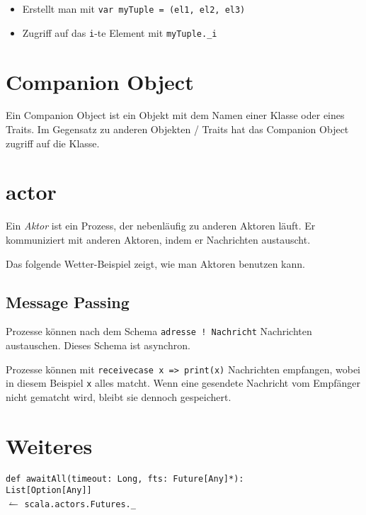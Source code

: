 \begin{itemize}
    \item Erstellt man mit \verb+var myTuple = (el1, el2, el3)+
    \item Zugriff auf das \verb+i+-te Element mit \verb+myTuple._i+
\end{itemize}

\section{Companion Object}
Ein Companion Object ist ein Objekt mit dem Namen einer Klasse oder eines Traits.
Im Gegensatz zu anderen Objekten / Traits hat das Companion Object zugriff auf
die Klasse.

\section{actor}
\begin{definition}[Aktor]%
    Ein \textit{Aktor} ist ein Prozess, der nebenläufig zu anderen Aktoren
    läuft. Er kommuniziert mit anderen Aktoren, indem er Nachrichten austauscht.
\end{definition}

Das folgende Wetter-Beispiel zeigt, wie man Aktoren benutzen kann.

\subsection{Message Passing}%
Prozesse können nach dem Schema \texttt{adresse ! Nachricht} Nachrichten austauschen.
Dieses Schema ist asynchron.

Prozesse können mit \texttt{receive{case x => print(x)}} Nachrichten empfangen,
wobei in diesem Beispiel \texttt{x} alles matcht. Wenn eine gesendete Nachricht
vom Empfänger nicht gematcht wird, bleibt sie dennoch gespeichert.

\section{Weiteres}
\texttt{def awaitAll(timeout: Long, fts: Future[Any]*):}\\
\-\hspace{1.8cm}\texttt{List[Option[Any]]}\\
\-\hspace{0.8cm}$\leftharpoonup$ \texttt{scala.actors.Futures.\_}

